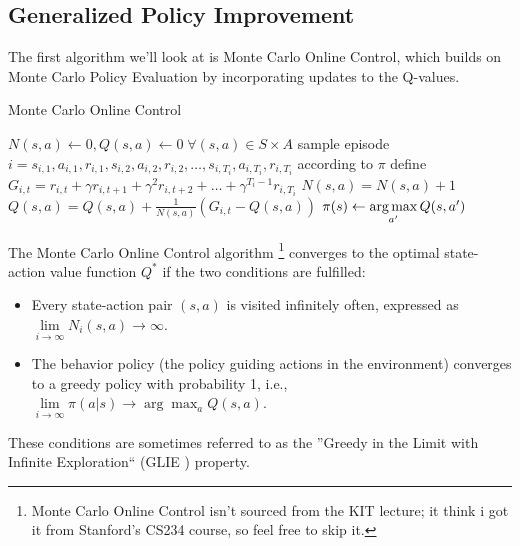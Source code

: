 \subsection{Generalized Policy Improvement}
The first algorithm we’ll look at is Monte Carlo Online Control, which builds on 
Monte Carlo Policy Evaluation by incorporating updates to the Q-values.
\begin{algorithm}[H]
    \caption{Monte Carlo Online Control}\label{Monte Carlo online control}
    \begin{algorithmic}
        \STATE $N(s,a)\gets 0, Q(s,a)\gets 0 \; \forall (s,a) \in S \times A$
        \STATE sample episode $i = s_{i,1},a_{i,1},r_{i,1},s_{i,2},a_{i,2},r_{i,2},\dots,s_{i,T_i},a_{i,T_i},r_{i,T_i}$ according to $\pi$ 
        \STATE define $G_{i,t} = r_{i,t}+ \gamma  r_{i,t+1} + \gamma^2  r_{i,t+2} + \dots +  \gamma^{T_i -1}  r_{i,T_i} $ 
        \STATE $N(s,a)= N(s,a)+1$
        \STATE $Q(s,a) = Q(s,a)+ \frac{1}{N(s,a)}(G_{i,t}-Q(s,a))$
        \STATE $\pi(s) \gets \operatorname*{arg\,max}\limits_{a'} Q(s,a')$
        \ENDIF
        \ENDFOR
        \ENDFOR
    \end{algorithmic}
\end{algorithm}
The Monte Carlo Online Control algorithm \footnote{ Monte Carlo Online Control isn’t sourced from the KIT lecture; it think i got it from Stanford’s CS234 course, so feel free to skip it.} converges to the optimal state-action 
value function $Q^*$ if the two conditions are fulfilled:
\begin{itemize}
\item Every state-action pair $(s, a)$ is visited infinitely often, expressed as
$\lim\limits_{i \to \infty} N_i(s, a) \to \infty$.
\item The behavior policy (the policy guiding actions in the environment) converges
to a greedy policy with probability 1, i.e., $\lim\limits_{i \to \infty} \pi(a|s) \to \arg\max_a Q(s, a)$.
\end{itemize}
These conditions are sometimes referred to as the ''Greedy in the Limit with Infinite Exploration``
(GLIE \label{glie}) property.

